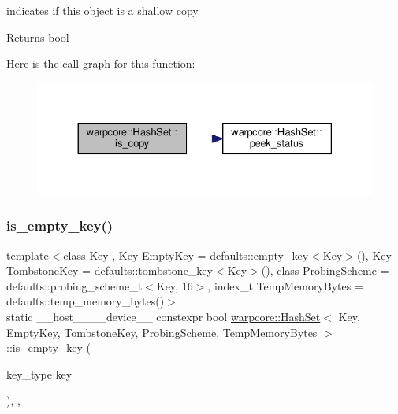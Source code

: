 indicates if this object is a shallow copy 

\begin{DoxyReturn}{Returns}
{\ttfamily bool} 
\end{DoxyReturn}
Here is the call graph for this function\+:
\nopagebreak
\begin{figure}[H]
\begin{center}
\leavevmode
\includegraphics[width=330pt]{classwarpcore_1_1HashSet_ac1b20d9d5305bbd8e7fca93aa580c984_cgraph}
\end{center}
\end{figure}
\mbox{\label{classwarpcore_1_1HashSet_ade9bc606ceba67c90aac5ee3aa43ddc7}} 
\subsubsection{\texorpdfstring{is\+\_\+empty\+\_\+key()}{is\_empty\_key()}}
{\footnotesize\ttfamily template$<$class Key , Key Empty\+Key = defaults\+::empty\+\_\+key$<$\+Key$>$(), Key Tombstone\+Key = defaults\+::tombstone\+\_\+key$<$\+Key$>$(), class Probing\+Scheme  = defaults\+::probing\+\_\+scheme\+\_\+t$<$\+Key, 16$>$, index\+\_\+t Temp\+Memory\+Bytes = defaults\+::temp\+\_\+memory\+\_\+bytes()$>$ \\
static \+\_\+\+\_\+host\+\_\+\+\_\+\+\_\+\+\_\+device\+\_\+\+\_\+ constexpr bool \hyperlink{classwarpcore_1_1HashSet}{warpcore\+::\+Hash\+Set}$<$ Key, Empty\+Key, Tombstone\+Key, Probing\+Scheme, Temp\+Memory\+Bytes $>$\+::is\+\_\+empty\+\_\+key (\begin{DoxyParamCaption}\item[{key\+\_\+type}]{key }\end{DoxyParamCaption})\hspace{0.3cm}{\ttfamily [inline]}, {\ttfamily [static]}, {\ttfamily [noexcept]}}



